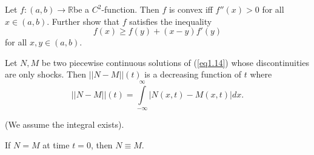 \begin{exercise}\label{chap1:exer1.4}
Let $f: (a,b) \to \mathbb{R}$\pageoriginale be a $C^2$-function. Then $f$ is convex iff $f''(x) > 0$ for all $x \in (a,b)$. Further show that $f$ satisfies the inequality
\begin{equation*}
f(x) \geq f(y) + (x-y) f'(y)\tag{1.15}\label{eq1.15}
\end{equation*}
for all $x,y \in (a,b)$.
\end{exercise}

\begin{theorem*}
Let $N,M$ be two piecewise continuous solutions of (\ref{eq1.14}) whose discontinuities are only shocks. Then $||N-M||(t)$ is a decreasing function of $t$ where
$$
||N-M|| (t) = \int\limits^\infty_{-\infty} |N(x,t) - M (x,t) |dx.
$$
\end{theorem*}

(We assume the integral exists).

\medskip
\begin{coro*}
If $N=M$ at time $t = 0$, then $N \equiv M$.
\end{coro*}

